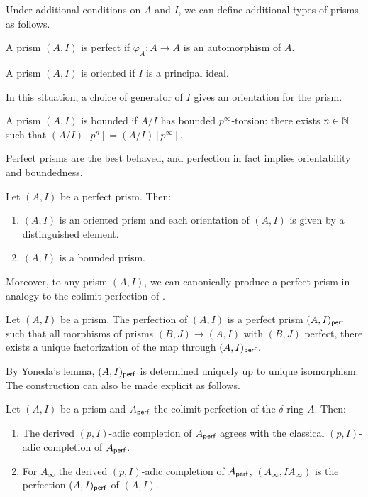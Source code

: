 Under additional conditions on $A$ and $I$, we can define additional types of prisms as follows. 
\begin{definition}\label{def: perfect prism}
    A prism $(A,I)$ is perfect if $\widetilde{\varphi}_{A}:A\to A$ is an automorphism of $A$. 
\end{definition}
\begin{definition}\label{def: oriented prism}
    A prism $(A,I)$ is oriented if $I$ is a principal ideal. 
\end{definition}
\begin{remark}
    In this situation, a choice of generator of $I$ gives an orientation for the prism. 
\end{remark}
\begin{definition}\label{def: bounded prism}
    A prism $(A,I)$ is bounded if $A/I$ has bounded $p^{\infty}$-torsion: there exists $n\in\mathbb{N}$ such that $(A/I)[p^{n}]=(A/I)[p^{\infty}]$. 
\end{definition}
Perfect prisms are the best behaved, and perfection in fact implies orientability and boundedness. 
\begin{proposition}\label{prop: perfect implies orientable and bounded}
    Let $(A,I)$ be a perfect prism. Then:
    \begin{enumerate}[label=(\roman*)]
        \item $(A,I)$ is an oriented prism and each orientation of $(A,I)$ is given by a distinguished element. 
        \item $(A,I)$ is a bounded prism. 
    \end{enumerate}
\end{proposition}
Moreover, to any prism $(A,I)$, we can canonically produce a perfect prism in analogy to the colimit perfection of . 
\begin{definition}\label{def: perfection of a prism}
    Let $(A,I)$ be a prism. The perfection of $(A,I)$ is a perfect prism $(A,I)_{\mathsf{perf}}$ such that all morphisms of prisms $(B,J)\to(A,I)$ with $(B,J)$ perfect, there exists a unique factorization of the map through $(A,I)_{\mathsf{perf}}$. 
\end{definition}
By Yoneda's lemma, $(A,I)_{\mathsf{perf}}$ is determined uniquely up to unique isomorphism. The construction can also be made explicit as follows. 
\begin{proposition}\label{prop: perfection construction for prisms}
    Let $(A,I)$ be a prism and $A_{\mathsf{perf}}$ the colimit perfection of the $\delta$-ring $A$. Then:
    \begin{enumerate}[label=(\roman*)]
        \item The derived $(p,I)$-adic completion of $A_{\mathsf{perf}}$ agrees with the classical $(p,I)$-adic completion of $A_{\mathsf{perf}}$. 
        \item For $A_{\infty}$ the derived $(p,I)$-adic completion of $A_{\mathsf{perf}}$, $(A_{\infty},IA_{\infty})$ is the perfection $(A,I)_{\mathsf{perf}}$ of $(A,I)$. 
    \end{enumerate}
\end{proposition}
